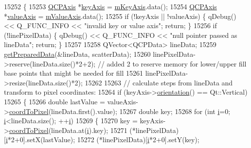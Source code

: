 \begin{DoxyCode}
15252 \{
15253   \hyperlink{class_q_c_p_axis}{QCPAxis} *\hyperlink{class_q_c_p_abstract_plottable_a72c7a09c22963f2c943f07112b311103}{keyAxis} = \hyperlink{class_q_c_p_abstract_plottable_a426f42e254d0f8ce5436a868c61a6827}{mKeyAxis}.data();
15254   \hyperlink{class_q_c_p_axis}{QCPAxis} *\hyperlink{class_q_c_p_abstract_plottable_a3106f9d34d330a6097a8ec5905e5b519}{valueAxis} = \hyperlink{class_q_c_p_abstract_plottable_a2901452ca4aea911a1827717934a4bda}{mValueAxis}.data();
15255   \textcolor{keywordflow}{if} (!keyAxis || !valueAxis) \{ qDebug() << Q\_FUNC\_INFO << \textcolor{stringliteral}{"invalid key or value axis"}; \textcolor{keywordflow}{return}; \}
15256   \textcolor{keywordflow}{if} (!linePixelData) \{ qDebug() << Q\_FUNC\_INFO << \textcolor{stringliteral}{"null pointer passed as lineData"}; \textcolor{keywordflow}{return}; \}
15257   
15258   QVector<QCPData> lineData;
15259   \hyperlink{class_q_c_p_graph_ab420b46ba638dc3252439fe16687b244}{getPreparedData}(&lineData, scatterData);
15260   linePixelData->reserve(lineData.size()*2+2); \textcolor{comment}{// added 2 to reserve memory for lower/upper fill base
       points that might be needed for fill}
15261   linePixelData->resize(lineData.size()*2);
15262   
15263   \textcolor{comment}{// calculate steps from lineData and transform to pixel coordinates:}
15264   \textcolor{keywordflow}{if} (keyAxis->\hyperlink{class_q_c_p_axis_a57483f2f60145ddc9e63f3af53959265}{orientation}() == Qt::Vertical)
15265   \{
15266     \textcolor{keywordtype}{double} lastValue = valueAxis->\hyperlink{class_q_c_p_axis_a985ae693b842fb0422b4390fe36d299a}{coordToPixel}(lineData.first().value);
15267     \textcolor{keywordtype}{double} key;
15268     \textcolor{keywordflow}{for} (\textcolor{keywordtype}{int} \hyperlink{_comparision_pictures_2_createtest_image_8m_a6f6ccfcf58b31cb6412107d9d5281426}{i}=0; \hyperlink{_comparision_pictures_2_createtest_image_8m_a6f6ccfcf58b31cb6412107d9d5281426}{i}<lineData.size(); ++\hyperlink{_comparision_pictures_2_createtest_image_8m_a6f6ccfcf58b31cb6412107d9d5281426}{i})
15269     \{
15270       key = keyAxis->\hyperlink{class_q_c_p_axis_a985ae693b842fb0422b4390fe36d299a}{coordToPixel}(lineData.at(\hyperlink{_comparision_pictures_2_createtest_image_8m_a6f6ccfcf58b31cb6412107d9d5281426}{i}).key);
15271       (*linePixelData)[\hyperlink{_comparision_pictures_2_createtest_image_8m_a6f6ccfcf58b31cb6412107d9d5281426}{i}*2+0].setX(lastValue);
15272       (*linePixelData)[\hyperlink{_comparision_pictures_2_createtest_image_8m_a6f6ccfcf58b31cb6412107d9d5281426}{i}*2+0].setY(key);

\end{DoxyCode}
